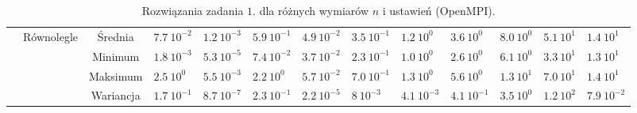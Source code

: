 \documentclass[11pt, a4paper, oneside]{article}
\begin{document}
\begin{table}[t]
\begin{adjustwidth}{-1.76cm}{}
\begin{tabular}{|c|c|c|l|l|l|l|l|l|l|l|l|l|}
                      & \multirow{4}{*}{Równolegle}   & Średnia   & $7.7 \ 10^{-2}$          & $1.2 \ 10^{-3}$         & $5.9 \ 10^{-1}$          & $4.9 \ 10^{-2}$         & $3.5 \ 10^{-1}$          & $1.2 \ 10^{0}$          & $3.6 \ 10^{0}$           & $8.0 \ 10^{0}$          & $5.1 \ 10^{1}$           & $1.4 \ 10^{1}$          \\ \cline{3-13} 
                      &                               & Minimum   & $1.8 \ 10^{-3}$          & $5.3 \ 10^{-5}$         & $7.4 \ 10^{-2}$          & $3.7 \ 10^{-2}$         & $2.3 \ 10^{-1}$          & $1.0 \ 10^{0}$          & $2.6 \ 10^{0}$           & $6.1 \ 10^{0}$          & $3.3 \ 10^{1}$           & $1.3 \ 10^{1}$          \\ \cline{3-13} 
                      &                               & Maksimum  & $2.5 \ 10^{0}$           & $5.5 \ 10^{-3}$         & $2.2 \ 10^{0}$           & $5.7 \ 10^{-2}$         & $7.0 \ 10^{-1}$          & $1.3 \ 10^{0}$          & $5.6 \ 10^{0}$           & $1.3 \ 10^{1}$          & $7.0 \ 10^{1}$           & $1.4 \ 10^{1}$          \\ \cline{3-13} 
                      &                               & Wariancja & $1.7 \ 10^{-1}$          & $8.7 \ 10^{-7}$         & $2.3 \ 10^{-1}$          & $2.2 \ 10^{-5}$         & $8 \ 10^{-3}$            & $4.1 \ 10^{-3}$         & $4.1 \ 10^{-1}$          & $3.5 \ 10^{0}$          & $1.2 \ 10^{2}$           & $7.9 \ 10^{-2}$         \\ \hline
\end{tabular}
\end{adjustwidth}
\caption{Rozwiązania zadania $1$. dla różnych wymiarów $n$ i ustawień (OpenMPI).}
\label{tab:MPI:zad_1}
\end{table}
\end{document}
